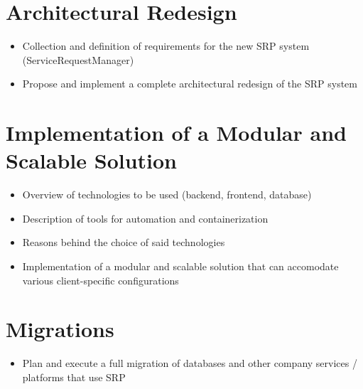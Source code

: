 \documentclass[a4paper, oneside, openright]{book}
\begin{document}
\tableofcontents  %
\newpage %
\setcounter{chapter}{-1} %
% 
% 






\chapter{Architectural Redesign}
\begin{itemize}
    \item Collection and definition of requirements for the new SRP system (ServiceRequestManager)
    \item Propose and implement a complete architectural redesign of the SRP system
\end{itemize}

\chapter{Implementation of a Modular and Scalable Solution}
\begin{itemize}
    \item Overview of technologies to be used (backend, frontend, database)
    \item Description of tools for automation and containerization
    \item Reasons behind the choice of said technologies
    \item Implementation of a modular and scalable solution that can accomodate various client-specific configurations
\end{itemize}

\chapter{Migrations}
\begin{itemize}
    \item Plan and execute a full migration of databases and other company services / platforms that use SRP
\end{itemize}
\end{document}
